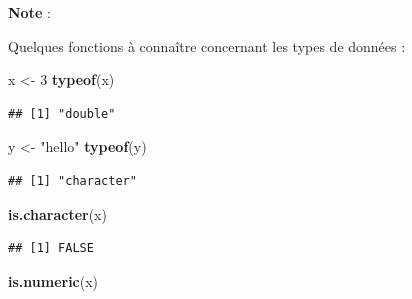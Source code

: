 \documentclass[
  11pt,
]{book}
\newcommand{\VERB}{\Verb[commandchars=\\\{\}]}
\newenvironment{Shaded}{\begin{snugshade}}{\end{snugshade}}
\newcommand{\DecValTok}[1]{\textcolor[rgb]{0.00,0.00,0.81}{#1}}
\newcommand{\FunctionTok}[1]{\textcolor[rgb]{0.13,0.29,0.53}{\textbf{#1}}}
\newcommand{\NormalTok}[1]{#1}
\newcommand{\OtherTok}[1]{\textcolor[rgb]{0.56,0.35,0.01}{#1}}
\newcommand{\StringTok}[1]{\textcolor[rgb]{0.31,0.60,0.02}{#1}}
\providecommand{\tightlist}{%
  \setlength{\itemsep}{0pt}\setlength{\parskip}{0pt}}
\numberwithin{equation}{section}
\numberwithin{countremarque}{section}
\newenvironment{notebox}{
  \begin{tcolorbox}[breakable, colback=jaune,coltext=black,
                  colframe=grisfonce]}
 {\end{tcolorbox}}
\begin{document}
\begin{notebox}

\textbf{Note} :

Quelques fonctions à connaître concernant les types de données :


\begin{Shaded}
\begin{Highlighting}[]
\NormalTok{x }\OtherTok{\textless{}{-}} \DecValTok{3}
\FunctionTok{typeof}\NormalTok{(x)}
\end{Highlighting}
\end{Shaded}

\begin{lstlisting}
## [1] "double"
\end{lstlisting}

\begin{Shaded}
\begin{Highlighting}[]
\NormalTok{y }\OtherTok{\textless{}{-}} \StringTok{"hello"}
\FunctionTok{typeof}\NormalTok{(y)}
\end{Highlighting}
\end{Shaded}

\begin{lstlisting}
## [1] "character"
\end{lstlisting}


\begin{Shaded}
\begin{Highlighting}[]
\FunctionTok{is.character}\NormalTok{(x)}
\end{Highlighting}
\end{Shaded}

\begin{lstlisting}
## [1] FALSE
\end{lstlisting}

\begin{Shaded}
\begin{Highlighting}[]
\FunctionTok{is.numeric}\NormalTok{(x)}
\end{Highlighting}
\end{Shaded}


\end{notebox}
\end{document}
